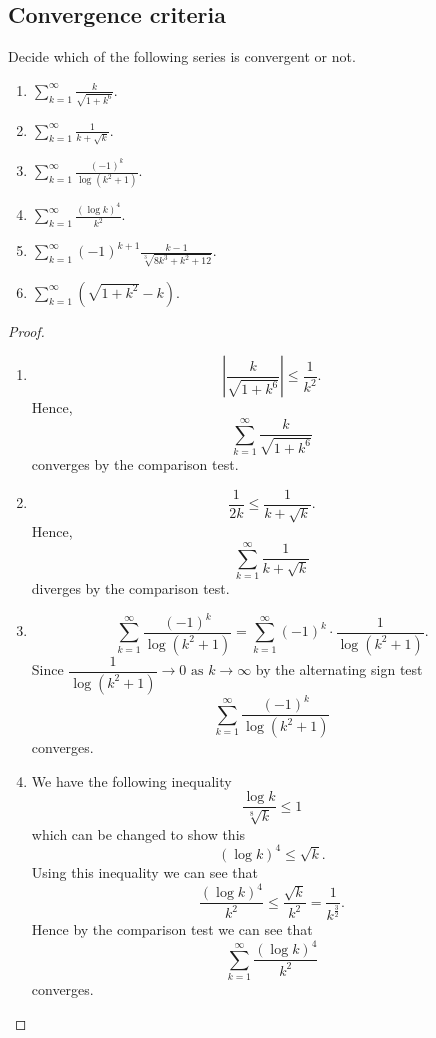 \documentclass[10pt, a4paper]{article}
\newcommand{\limas}[3][n]{#2 \rightarrow #3 \text{ as } #1 \rightarrow \infty}
\newcommand{\infsum}[1][n = 1]{\sum_{#1}^{\infty}}
\begin{document}
\subsection{Convergence criteria}

\begin{example}
    Decide which of the following series is convergent or not.
    \begin{enumerate}[label = \alph*.]
        \item $\displaystyle \sum_{k = 1}^{\infty}\frac{k}{\sqrt{1 + k ^ 6}}.$
        \item $\displaystyle \sum_{k = 1}^{\infty}\frac{1}{k + \sqrt{k}}.$
        \item $\displaystyle \sum_{k = 1}^{\infty}\frac{(-1) ^ k}{\log{(k ^ 2 + 1)}}.$
        \item $\displaystyle \sum_{k = 1}^{\infty}\frac{(\log k) ^ 4}{k ^ 2}.$
        \item $\displaystyle \sum_{k = 1}^{\infty}(-1)^{k + 1}\frac{k - 1}{\sqrt[3]{8k ^ 3 + k ^ 2 + 12}}.$
        \item $\displaystyle \sum_{k = 1}^{\infty}\left(\sqrt{1 + k ^ 2} - k\right).$
    \end{enumerate}
    \begin{proof}
    \begin{enumerate}[label = \alph*.]
        \item \phantom{}
        \[
        \left|\frac{k}{\sqrt{1 + k ^ 6}}\right| \leq \frac{1}{k ^ 2}. 
        \]
        Hence,
        \[
        \infsum[k = 1]\frac{k}{\sqrt{1 + k ^ 6}}
        \]
        converges by the comparison test.

        \item
        \[
        \frac{1}{2k} \leq \frac{1}{k + \sqrt{k}}. 
        \]
        Hence,
        \[
        \infsum[k = 1]\frac{1}{k + \sqrt{k}}
        \]
        diverges by the comparison test.

        \item
        \[
        \infsum[k = 1]\frac{(-1) ^ k}{\log{(k ^ 2 + 1)}} = \infsum[k = 1](-1) ^ k \cdot \frac{1}{\log{(k ^ 2 + 1)}}.
        \]
        Since $\limas[k]{\dfrac{1}{\log(k ^ 2 + 1)}}{0}$ by the alternating sign test
        \[
        \infsum[k = 1]\frac{(-1) ^ k}{\log{(k ^ 2 + 1)}}
        \]
        converges.

        \item
        We have the following inequality
        \[
        \frac{\log k}{\sqrt[8]{k}} \leq 1
        \]
        which can be changed to show this
        \[
        (\log k) ^ 4 \leq \sqrt{k}.
        \]
        Using this inequality we can see that
        \[
        \frac{(\log k) ^ 4}{k ^ 2} \leq \frac{\sqrt{k}}{k ^ 2} = \frac{1}{k ^ {\frac{3}{2}}}.
        \]
        Hence by the comparison test we can see that
        \[
        \infsum[k = 1]\frac{(\log k) ^ 4}{k ^ 2}
        \]
        converges.
        
        
    \end{enumerate}
    \end{proof}
\end{example}
\end{document}
